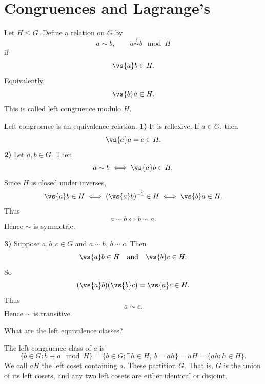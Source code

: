 
\section{Congruences and Lagrange's}

\begin{definition}
    Let $H\leq G$.
    Define a relation on $G$ by
    \[
        a\sim b,\qquad a\overset{\ell}{\sim} b\mod H
    \]
    if
    \[
        \vs{a}b\in H.
    \]
    Equivalently,
    \[
        \vs{b}a\in H.
    \]
    This is called left congruence modulo $H$.
\end{definition}

\begin{theorem}{
    Left congruence is an equivalence relation.
}
    \textbf{1)}
    It is reflexive.
    If $a\in G$, then
    \[
        \vs{a}a=e\in H.
    \]
    \textbf{2)}
    Let $a,b\in G$.
    Then
    \[
        a\sim b \iff \vs{a}b\in H.
    \]
    Since $H$ is closed under inverses,
    \[
        \vs{a}b\in H \iff (\vs{a}b)^{-1}\in H \iff \vs{b}a\in H.
    \]
    Thus
    \[
        a\sim b \iff b\sim a.
    \]
    Hence $\sim$ is symmetric.

    \textbf{3)}
    Suppose $a,b,c\in G$ and $a\sim b$, $b\sim c$.
    Then
    \[
        \vs{a}b\in H
        \quad\text{and}\quad
        \vs{b}c\in H.
    \]
    So
    \[
        (\vs{a}b)(\vs{b}c)=\vs{a}c\in H.
    \]
    Thus
    \[
        a\sim c.
    \]
    Hence $\sim$ is transitive.
\end{theorem}

What are the left equivalence classes?

\begin{definition}
    The left congruence class of $a$ is
    \[
        \{b\in G:b\equiv a\mod H\}
        =
        \{b\in G:\exists h\in H,\ b=ah\}
        =
        aH
        =
        \{ah:h\in H\}.
    \]
    We call $aH$ the left coset containing $a$.
    These partition $G$.
    That is, $G$ is the union of its left cosets, and any two left cosets are either identical or disjoint.
\end{definition}

